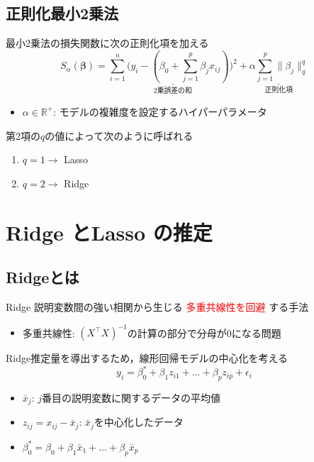 \documentclass[dvipdfmx, 10pt]{beamer}
\begin{document}
\subsection{正則化最小2乗法}
\begin{frame}{\insertsubsection}
     最小2乗法の損失関数に次の正則化項を加える
    \begin{equation}
        S_{\alpha}(\bm{\beta}) = 
        \underset{\text{2乗誤差の和}}{\underline{
            \sum_{i=1}^{n}\bigl(
        		y_i - (
        			\beta_0 + \sum_{j=1}^{p} \beta_j {x}_{ij}
        		)
            \bigr)^2
        }}
    	 +  \underset{\text{正則化項}}{\underline{
            \alpha \sum_{j=1}^{p} \|\beta_j\|_q^q
        }}
    	\label{eq:extendLinearRegression}
    \end{equation}
    \begin{itemize}
        \item $\alpha \in \mathbb{R}^+$: モデルの複雑度を設定するハイパーパラメータ
     \end{itemize}
     \vspace{10pt}
    第2項の$q$の値によって次のように呼ばれる
    \begin{enumerate}
        \item $q=1 \rightarrow$ Lasso
        \item $q=2 \rightarrow$ Ridge
    \end{enumerate}
\end{frame}

\section{Ridge とLasso の推定}
\subsection{Ridgeとは}
\begin{frame}{\insertsubsection}
    \begin{block}{Ridge}
        説明変数間の強い相関から生じる
        \textcolor{red}{多重共線性を回避}
        する手法
        \begin{itemize}
        	\item 多重共線性: $(X^{\top}X)^{-1}$の計算の部分で分母が0になる問題
        \end{itemize}
    \end{block}
    \vspace{10pt}
    Ridge推定量を導出するため，線形回帰モデルの中心化を考える
    \begin{equation}
        y_i = \beta_0^* + \beta_1 z_{i1} + \dots + \beta_p z_{ip} + \epsilon_i
	\label{eq:linear_model_centering}
    \end{equation}
    \begin{itemize}
    	\item $\bar{x}_j$: $j$番目の説明変数に関するデータの平均値
	\item $z_{ij}=x_{ij} - \bar{x}_j$: $\bar{x}_j$を中心化したデータ
	\item $\beta_0^* = \beta_0 + \beta_1 \bar{x}_{1} + \dots + \beta_p \bar{x}_{p}$
    \end{itemize}
\end{frame}
\end{document}
